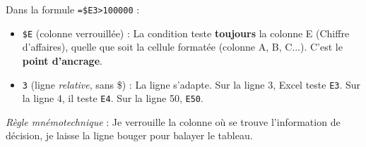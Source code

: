 \documentclass[11pt]{article}
\begin{document}
\begin{propriete}
Dans la formule \texttt{=\$E3>100000} :
\begin{itemize}
    \item \texttt{\$E} (colonne verrouillée) : La condition teste \textbf{toujours} la colonne E (Chiffre d'affaires), quelle que soit la cellule formatée (colonne A, B, C...). C'est le \textbf{point d'ancrage}.
    \item \texttt{3} (ligne \emph{relative}, sans \$) : La ligne s'adapte. Sur la ligne 3, Excel teste \texttt{E3}. Sur la ligne 4, il teste \texttt{E4}. Sur la ligne 50, \texttt{E50}.
\end{itemize}
\emph{Règle mnémotechnique} : \og Je verrouille la colonne où se trouve l'information de décision, je laisse la ligne bouger pour balayer le tableau. \fg
\end{propriete}
\end{document}
